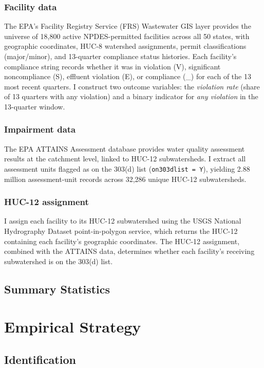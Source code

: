 \documentclass[12pt]{article}
\begin{document}
\subsubsection*{Facility data} The EPA's Facility Registry Service (FRS) Wastewater GIS layer provides the universe of 18,800 active NPDES-permitted facilities across all 50 states, with geographic coordinates, HUC-8 watershed assignments, permit classifications (major/minor), and 13-quarter compliance status histories. Each facility's compliance string records whether it was in violation (V), significant noncompliance (S), effluent violation (E), or compliance (\_) for each of the 13 most recent quarters. I construct two outcome variables: the \textit{violation rate} (share of 13 quarters with any violation) and a binary indicator for \textit{any violation} in the 13-quarter window.

\subsubsection*{Impairment data} The EPA ATTAINS Assessment database provides water quality assessment results at the catchment level, linked to HUC-12 subwatersheds. I extract all assessment units flagged as on the 303(d) list (\texttt{on303dlist = Y}), yielding 2.88 million assessment-unit records across 32,286 unique HUC-12 subwatersheds.

\subsubsection*{HUC-12 assignment} I assign each facility to its HUC-12 subwatershed using the USGS National Hydrography Dataset point-in-polygon service, which returns the HUC-12 containing each facility's geographic coordinates. The HUC-12 assignment, combined with the ATTAINS data, determines whether each facility's receiving subwatershed is on the 303(d) list.

\subsection{Summary Statistics}




\section{Empirical Strategy}

\subsection{Identification}
\end{document}
